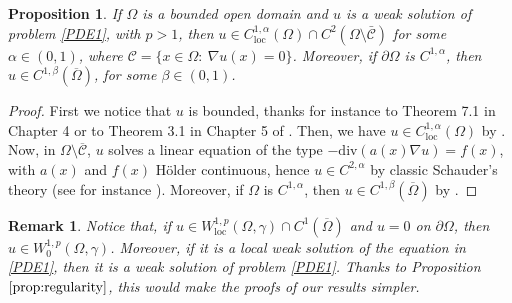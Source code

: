 \documentclass[12pt]{amsart}
\newtheorem{proposition}[theorem]{Proposition}
\newtheorem{remark}[theorem]{Remark}
\newcommand{\1}{\mathbf 1}
\newcommand{\C}{\mathcal C}
\begin{document}
\begin{proposition}\label{prop:regularity}
If $\Omega$ is a bounded open domain and $u$ is a weak solution of problem \eqref{PDE1}, with $p>1$, then $u\in C^{1,\alpha}_{\mathrm{loc}}(\Omega)\cap C^2(\Omega\setminus\bar{\C})$ for some $\alpha \in (0,1)$, where $\C=\{x\in \Omega:\ \nabla u(x)=0 \}$.
Moreover, if $\partial\Omega$ is $C^{1,\alpha}$, then $u\in C^{1,\beta}(\overline\Omega)$, for some $\beta\in(0,1)$.
\end{proposition}
\begin{proof}
First we notice that $u$ is bounded, thanks for instance to Theorem 7.1 in Chapter 4 or to Theorem 3.1 in Chapter 5 of \cite{Ladizeskaya-Ural'ceva-1968}.
Then, we have $u\in C^{1,\alpha}_{\text{loc}}(\Omega)$ by \cite[Theorem 1]{Tolksdorf}. Now, in $\Omega\setminus\overline{\C}$, $u$ solves a linear equation of the type $-\text{div}(a(x) \nabla u)= f(x)$, with $a(x)$ and $f(x)$ H\"older continuous, hence $u\in C^{2,\alpha}$ by classic Schauder's theory (see for instance \cite{GT}). Moreover, if $\Omega$ is $C^{1,\alpha}$, then $u\in C^{1,\beta}(\overline\Omega)$ by \cite[Theorem 1]{Lieberman}.
\end{proof}
\begin{remark}\label{localtoglobalsolution}
Notice that, if $u\in W^{1,p}_{\mathrm{loc}}(\Omega,\gamma)\cap C^1(\overline\Omega)$ and $u=0$ on $\partial\Omega$, then $u\in W^{1,p}_{0}(\Omega,\gamma)$. Moreover, if it is a local weak solution of the equation in \eqref{PDE1}, then it is a weak solution of  problem \eqref{PDE1}. Thanks to Proposition $\ref{prop:regularity}$, this would make the proofs of our results simpler.
\end{remark}
\end{document}
